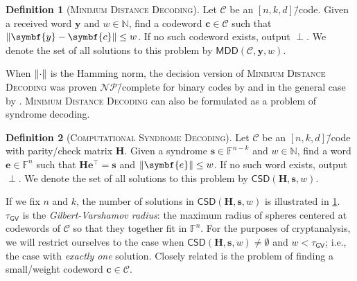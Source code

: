 \documentclass[version=last, paper=A4, parskip=half, oneside]{scrbook}
\theoremstyle{plain}
\theoremstyle{definition}
\newtheorem{definition}{Definition}
\theoremstyle{remark}
\renewcommand*{\vec}{\symbf}
\newcommand*{\mat}{\symbf}
\newcommand*{\trans}{\top}%
\newcommand*{\FF}{\ensuremath{\mathbb{F}}}
\newcommand*{\NN}{\ensuremath{\mathbb{N}}}
\newcommand*{\NP}{\ensuremath{\mathcal{NP}}}
\newcommand*{\MDD}{\ensuremath{\mathsf{MDD}}}
\newcommand*{\CSD}{\ensuremath{\mathsf{CSD}}}
\DeclarePairedDelimiter{\norm}{\lVert}{\rVert}
\newcommand*{\GV}{\ensuremath{\mathsf{GV}}}
\begin{document}
\begin{definition}[\textsc{Minimum Distance Decoding}]
  Let \(\mathcal{C}\) be an \([n, k, d]\)\=/code.  Given a received word
  \(\vec{y}\) and \(w \in \NN\), find a codeword \(\vec{c} \in \mathcal{C}\)
  such that \(\norm{\vec{y} - \vec{c}} \le w\).  If no such codeword exists,
  output \(\perp\).  We denote the set of all solutions to this problem by
  \(\MDD(\mathcal{C}, \vec{y}, w)\).
\end{definition}

When \(\norm{\cdot}\) is the Hamming norm, the decision version of
\textsc{Minimum Distance Decoding} was proven \NP\=/complete for binary codes by
\textcite{BEvT78} and in the general case by \textcite{Bar94}.  \textsc{Minimum
  Distance Decoding} can also be formulated as a problem of syndrome decoding.

\begin{definition}[\textsc{Computational Syndrome Decoding}]
  Let \(\mathcal{C}\) be an \([n, k, d]\)\=/code with parity\-/check matrix
  \(\mat{H}\).  Given a syndrome \(\vec{s} \in \FF^{n - k}\) and \(w \in \NN\),
  find a word \(\vec{e} \in \FF^n\) such that
  \(\mat{H} \vec{e}^{\trans} = \vec{s}\) and \(\norm{\vec{e}} \le w\).  If no
  such word exists, output \(\perp\).  We denote the set of all solutions to
  this problem by \(\CSD(\mat{H}, \vec{s}, w)\).
\end{definition}

\begin{figure}
  \centering
  \captionbelow{Number of solutions in
    \(\CSD(\mat{H}, \vec{s}, w)\)}\label{fig:CSD-cardinality}
\end{figure}

If we fix \(n\) and \(k\), the number of solutions in
\(\CSD(\mat{H}, \vec{s}, w)\) is illustrated in \cref{fig:CSD-cardinality}.
\(\tau_{\mathsf{GV}}\) is the \emph{Gilbert\--Varshamov radius}: the maximum
radius of spheres centered at codewords of \(\mathcal{C}\) so that they together
fit in \(\FF^n\).  For the purposes of cryptanalysis, we will restrict ourselves
to the case when \(\CSD(\mat{H}, \vec{s}, w) \ne \emptyset\) and
\(w < \tau_{\mathsf{GV}}\); i.e., the case with \emph{exactly one} solution.
Closely related is the problem of finding a small\-/weight codeword
\(\vec{c} \in \mathcal{C}\).
\end{document}
